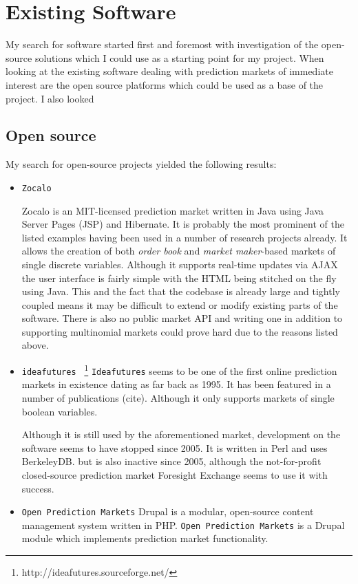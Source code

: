 \documentclass[bsc,frontabs,twoside,singlespacing,parskip,deptreport]{infthesis}     %
\begin{document}
\section{Existing Software}
% 
	My search for software started first and foremost with  investigation of the open-source solutions which I could use as a starting point for my project. 
	When looking at the existing software dealing with prediction markets of immediate interest are the open source platforms which could be used as a base of the project. I also looked 

\subsection{Open source}
	My search for open-source projects yielded the following results:

\begin{itemize}
\item {\tt Zocalo}

	Zocalo is an MIT-licensed prediction market written in Java using Java Server Pages (JSP) and Hibernate. It is probably the most prominent of the listed examples having been used in a number of research projects already. It allows the creation of both {\em order book} and {\em market maker}-based markets of single discrete variables. Although it supports real-time updates via AJAX the user interface is fairly simple with the HTML being stitched on the fly using Java. This and the fact that the codebase is already large and tightly coupled means it may be difficult to extend or modify existing parts of the software. There is also no public market API and writing one in addition to supporting multinomial markets could prove hard due to the reasons listed above. 

\item {\tt ideafutures } \footnote{http://ideafutures.sourceforge.net/}
	{\tt Ideafutures} seems to be one of the first online prediction markets in existence dating as far back as 1995. It has been featured in a number of publications (cite). Although it only supports markets of single boolean variables. 

Although it is still used by the aforementioned market, development on the software seems to have stopped since 2005. It is written in Perl and uses BerkeleyDB.  but is also inactive since 2005, although the not-for-profit closed-source prediction market Foresight Exchange seems to use it with success. 

\item {\tt Open Prediction Markets} 
	Drupal is a modular, open-source content management system written in PHP. {\tt Open Prediction Markets} is a Drupal module which implements prediction market functionality. 
\end{itemize}
\end{document}
